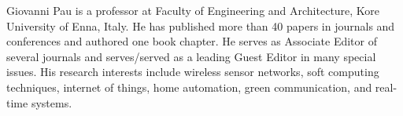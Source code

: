 \documentclass[12pt, draftclsnofoot, onecolumn]{IEEEtran}
\begin{document}

\begin{IEEEbiographynophoto}{Giovanni Pau}
	is a professor at Faculty of Engineering and Architecture, Kore University of Enna, Italy. He has published more than 40 papers in journals and conferences and authored one book chapter. He serves as Associate Editor of several journals and serves/served as a leading Guest Editor in many special issues. His research interests include wireless sensor networks, soft computing techniques, internet of things, home automation, green communication, and real-time systems.
\end{IEEEbiographynophoto}

\end{document}
